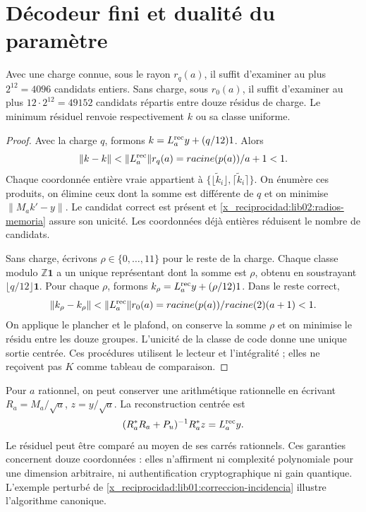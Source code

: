 \section{Décodeur fini et dualité du paramètre}
\label{x_reciprocidad:lib02:computacion}

\begin{proposition}
\label{x_reciprocidad:lib02:decodificador}
Avec une charge connue, sous le rayon \(r_q(a)\), il suffit d'examiner au plus \(2^{12}=4096\) candidats entiers. Sans charge, sous \(r_0(a)\), il suffit d'examiner au plus \(12\cdot2^{12}=49152\) candidats répartis entre douze résidus de charge. Le minimum résiduel renvoie respectivement \(k\) ou sa classe uniforme.
\end{proposition}
\begin{proof}
Avec la charge \(q\), formons
\(\widetilde k=L_a^{\rm rec}y+(q/12)\mathbf1\). Alors
\[
 \|\widetilde k-k\|
 <\|L_a^{\rm rec}\|r_q(a)
 =\frac{\sqrt{p(a)}}{a+1}<1.
\]
Chaque coordonnée entière vraie appartient à
\(\{\lfloor\widetilde k_i\rfloor,
\lceil\widetilde k_i\rceil\}\). On énumère ces produits,
on élimine ceux dont la somme est différente de \(q\) et on minimise
\(\|M_ak'-y\|\). Le candidat correct est présent et
\cref{x_reciprocidad:lib02:radios-memoria} assure son unicité. Les coordonnées déjà entières
réduisent le nombre de candidats.

Sans charge, écrivons \(\rho\in\{0,\ldots,11\}\) pour le reste
de la charge. Chaque classe modulo \(\mathbb Z\mathbf1\) a un
unique représentant dont la somme est \(\rho\), obtenu en soustrayant
\(\lfloor q/12\rfloor\mathbf1\). Pour chaque \(\rho\), formons
\(\widetilde k_\rho=L_a^{\rm rec}y+(\rho/12)\mathbf1\).
Dans le reste correct,
\[
 \|\widetilde k_\rho-k_\rho\|
 <\|L_a^{\rm rec}\|r_0(a)
 =\frac{\sqrt{p(a)}}{\sqrt2(a+1)}<1.
\]
On applique le plancher et le plafond, on conserve la somme \(\rho\) et on minimise le résidu entre les douze groupes. L'unicité de la classe de code donne une unique sortie centrée. Ces procédures utilisent le lecteur et l'intégralité ; elles ne reçoivent pas \(K\) comme tableau de comparaison.
\end{proof}

Pour \(a\) rationnel, on peut conserver une arithmétique rationnelle en écrivant
\(R_a=M_a/\sqrt a\), \(z=y/\sqrt a\). La reconstruction centrée
est
\[
 (R_a^*R_a+P_u)^{-1}R_a^*z=L_a^{\rm rec}y.
\]
Le résiduel peut être comparé au moyen de ses carrés rationnels. Ces
garanties concernent douze coordonnées : elles n’affirment ni complexité
polynomiale pour une dimension arbitraire, ni authentification cryptographique ni
gain quantique. L’exemple perturbé de
\cref{x_reciprocidad:lib01:correccion-incidencia} illustre l’algorithme canonique.

